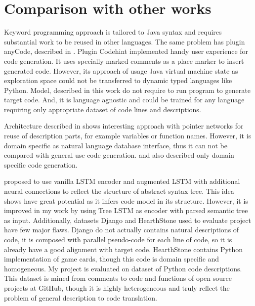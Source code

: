 \section{Comparison with other works}

Keyword programming approach \parencite{little2009keyword} is tailored to Java syntax and requires substantial work to be reused in other languages. The same problem has plugin anyCode, described in \cite{Gvero2015}. Plugin Codehint \parencite{Galenson2014} implemented handy user experience for code generation. It uses specially marked comments as a place marker to insert generated code. However, its approach of usage Java virtual machine state as exploration space could not be transferred to dynamic typed languages like Python. Model, described in this work do not require to run program to generate target code. And, it is language agnostic and could be trained for any language requiring only appropriate dataset of code lines and descriptions.

Architecture described in \cite{Zhong2017} shows interesting approach with pointer networks for reuse of description parts, for example variables or function names. However, it is domain specific as natural language database interface, thus it can not be compared with general use code generation. \cite{Chen2016} and \cite{Ling2016} also described only domain specific code generation.

\cite{Yin2017} proposed to use vanilla LSTM encoder and augmented LSTM with additional neural connections to reflect the structure of abstract syntax tree. This idea shows have great potential as it infers code model in its structure. However, it is improved in my work by using Tree LSTM as encoder with parsed semantic tree as input.  Additionally, datasets Django and HearthStone used to evaluate \cite{Yin2017} project have few major flaws. Django do not actually contains natural descriptions of code, it is composed with parallel pseudo-code for each line of code, so it is already have a good alignment with target code. HearthStone contains Python implementation of game cards, though this code is domain specific and homogeneous. My project is evaluated on \cite{Barone2017} dataset of Python code descriptions. This dataset is mined from comments to code and functions of open source projects at GitHub, though it is highly heterogeneous and truly reflect the problem of general description to code translation.